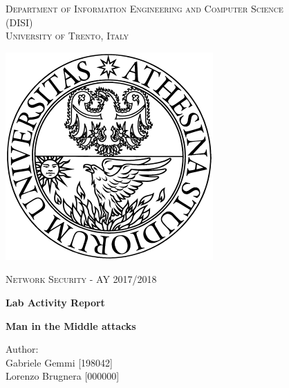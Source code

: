 \begin{titlepage}
	\begin{center}
   	{\scshape\LARGE
    	Department of Information Engineering and Computer Science\\
      	(DISI)\\
      	University of Trento, Italy\\\par}
      	\vspace{1cm}
      	\includegraphics[scale=0.35]{logo}\\
	\vspace{1cm}
	{\scshape\Large Network Security - AY 2017/2018 \par}
	\vspace{1cm}
	{\huge\bfseries Lab Activity Report\\\par}
	\noindent\makebox[\linewidth]{\rule{\linewidth}{0.4pt}}
	{\Large\bfseries Man in the Middle attacks\par}
      	\noindent\makebox[\linewidth]{\rule{\linewidth}{0.4pt}}

        \vspace{.5cm}
        Author: \\
       	Gabriele Gemmi [198042] \\
				Lorenzo Brugnera [000000]
      	\vfill
      	\vfill
	\end{center}
\end{titlepage}

